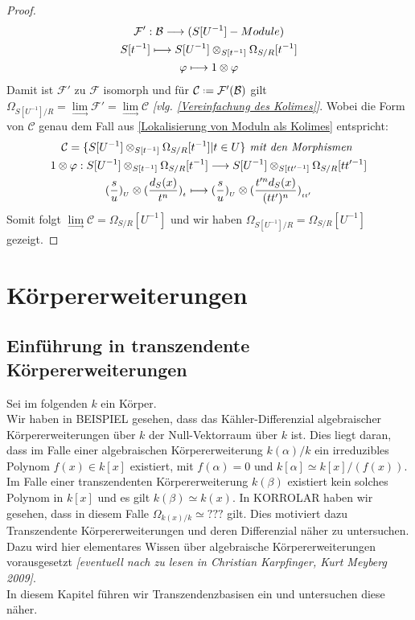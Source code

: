 \documentclass[10pt,a4paper]{report}
\newcommand{\comment}[1]{}
\newcommand{\Algebra}{Christian Karpfinger, Kurt Meyberg 2009}
\newcommand{\functionfront}[3]{\nolinebreak{#1:#2 \longrightarrow #3}}
\newcommand{\divR}[2]{\Omega_{#1/#2}}
\newcommand{\divf}[1]{d_{#1}}
\newcommand{\Tensor}[3]{#1 \otimes_{#2} #3}
\newcommand{\tensor}[3]{#1 \otimes #3}
\newcommand{\lok}[2]{#1 [#2^{-1}]}
\newcommand{\loke}[3]{(\frac{#1}{#2})_{_{#3}}}
\newcommand{\colimes}[0]{\lim\limits_{ \longrightarrow }}
\newcommand*{\defeq}{\mathrel{\vcenter{\baselineskip0.5ex \lineskiplimit0pt
                     \hbox{\scriptsize.}\hbox{\scriptsize.}}}%
                     =}
\begin{document}
\begin{proof}
{\begin{gather*}
\functionfront{\mathcal{F'}}{\mathcal{B}}{(\lok{S}{U} - Module)}\\
\lok{S}{t} \longmapsto \Tensor{\lok{S}{U}}{\lok{S}{t}}{\lok{\divR{S}{R}}{t}}\\
\varphi \longmapsto \tensor{1}{\lok{S}{t}}{\varphi}
\end{gather*}}
Damit ist $\mathcal{F'}$ zu $\mathcal{F}$ isomorph und für $\mathcal{C} \defeq \mathcal{F'}(\mathcal{B})$ gilt $\divR{\lok{S}{U}}{R}  = \colimes{\mathcal{F'}} = \colimes{\mathcal{C}}$ \textit{[vlg. \cref{Vereinfachung des Kolimes}]}.
Wobei die Form von $\mathcal{C}$ genau dem Fall aus \cref{Lokalisierung von Moduln als Kolimes} entspricht:
\begin{gather*}
\comment{\divR{\lok{S}{U}}{R}  = \colimes{\mathcal{C}} \text{, wobei:} \\}
\mathcal{C} = \lbrace \Tensor{\lok{S}{U}}{\lok{S}{t}}{\lok{\divR{S}{R}}{t}} \vert t \in U \rbrace \textit{ mit den Morphismen }\\
\functionfront{\tensor{1}{\lok{S}{t}}{\varphi}}{\Tensor{\lok{S}{U}}{\lok{S}{t}}{\lok{\divR{S}{R}}{t}}}{\Tensor{\lok{S}{U}}{\lok{S}{tt'}}{\lok{\divR{S}{R}}{tt'}}} \\
\tensor{\loke{s}{u}{U}}{\lok{S}{t}}{\loke{\divf{S}(x)}{t^n}{t}} \longmapsto \tensor{\loke{s}{u}{U}}{\lok{S}{tt'}}{\loke{t'^n\divf{S}(x)}{(tt')^n}{tt'}}
\end{gather*}
Somit folgt $\colimes \mathcal{C} = \lok{\divR{S}{R}}{U}$ und wir haben $\divR{\lok{S}{U}}{R} = \lok{\divR{S}{R}}{U}$ gezeigt.
\end{proof}


\chapter{Körpererweiterungen}

\section{Einführung in transzendente Körpererweiterungen}
Sei im folgenden $k$ ein Körper.\\
Wir haben in BEISPIEL \comment{\label{*Differenzial algebraischer Körpererweiteerungen ist Null}} gesehen, dass das Kähler-Differenzial algebraischer Körpererweiterungen über $k$ der Null-Vektorraum über $k$ ist. Dies liegt daran, dass im Falle einer algebraischen Körpererweiterung $k(\alpha)/k$ ein irreduzibles Polynom $f(x) \in k[x]$ existiert, mit $f(\alpha) = 0$ und $k[\alpha] \simeq k[x]/(f(x))$.\\
Im Falle einer transzendenten Körpererweiterung $k(\beta)$ existiert kein solches Polynom in $k[x]$ und es gilt $k(\beta) \simeq k(x)$. In KORROLAR \comment{\label{*Differenzial rationaler Funktionen}} haben wir gesehen, dass in diesem Falle $\divR{k(x)}{k} \simeq ???$ gilt. Dies motiviert dazu Transzendente Körpererweiterungen und deren Differenzial näher zu untersuchen. Dazu wird hier elementares Wissen über algebraische Körpererweiterungen vorausgesetzt \textit{[eventuell nach zu lesen in \Algebra]}.\\
In diesem Kapitel führen wir Transzendenzbasisen ein und untersuchen diese näher.\\
\end{document}
